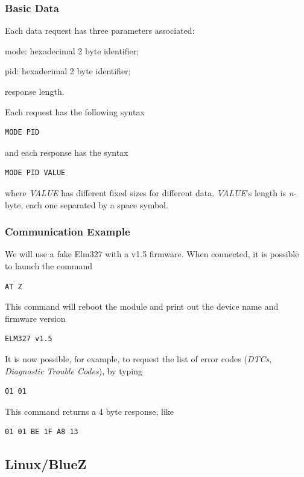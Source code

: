 \documentclass[twoside]{article}
\begin{document}
\begin{multicols}{2}
\subsubsection{Basic Data}

Each data request has three parameters associated:
\begin{compactitem}
  \item mode: hexadecimal 2 byte identifier;
  \item pid: hexadecimal 2 byte identifier;
  \item response length.
\end{compactitem}

Each request has the following syntax
\begin{lstlisting}[language=bash]
MODE PID
\end{lstlisting}
and each response has the syntax
\begin{lstlisting}[language=bash]
MODE PID VALUE
\end{lstlisting}
where \emph{VALUE} has different fixed sizes for different data.
\emph{VALUE}'s length is \emph{n}-byte, each one separated by a space symbol.

\subsubsection{Communication Example}
We will use a fake Elm327 with a v1.5 firmware.
When connected, it is possible to launch the command
\begin{lstlisting}[language=bash]
AT Z
\end{lstlisting}

This command will reboot the module and print out the device name and firmware version
\begin{lstlisting}[language=bash]
ELM327 v1.5
\end{lstlisting}

It is now possible, for example, to request the list of error codes (\emph{DTCs}, \emph{Diagnostic Trouble Codes}), by typing
\begin{lstlisting}[language=bash]
01 01
\end{lstlisting}
This command returns a 4 byte response, like
\begin{lstlisting}[language=bash]
01 01 BE 1F A8 13
\end{lstlisting}


\subsection{Linux/BlueZ}


\end{multicols}
\end{document}
